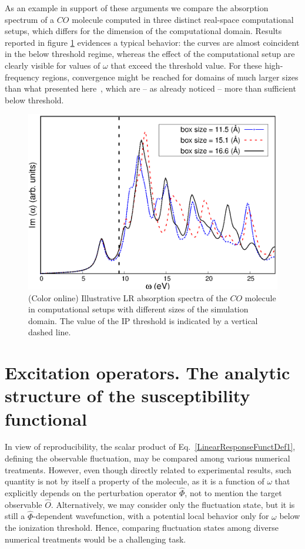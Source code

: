 \documentclass[reprint,aps,prb]{revtex4-1}
\newcommand{\op}[1]{\hat {#1}}
\begin{document}
As an example in support of these arguments we compare the absorption spectrum of a $CO$ molecule computed in 
three distinct real-space computational setups, which differs for the dimension of 
the computational domain. 
Results reported in figure \ref{co_spectrum} evidences a typical behavior: the curves are almost coincident in the below threshold regime,
whereas the effect of the computational setup are clearly visible for values of $\omega$ that exceed the threshold value.
For these high-frequency regions, convergence might be reached for domains of much larger sizes than what presented here~\cite{baroni2008},
which are -- as already noticed -- more than sufficient below threshold.

\begin{figure}
\includegraphics[scale=0.6]{Fig2_CO_spectrum.eps}
\caption{\label{co_spectrum}(Color online) Illustrative LR absorption spectra of the $CO$ molecule in computational setups with different sizes of the simulation domain. The value of the IP threshold is indicated by a vertical dashed line.}
\end{figure}


\section{Excitation operators. The analytic structure of the susceptibility functional}

In view of reproducibility, the scalar product of Eq.~\eqref{LinearResponseFunctDef1}, defining the observable fluctuation, may be compared among various numerical treatments.
However, even though directly related to experimental results, such quantity is not by itself a property of the molecule, as it is a function of $\omega$ that explicitly depends 
on the perturbation operator $\op \Phi$, not to mention the target observable $\op O$. Alternatively, we may consider only the fluctuation state, but it is still a $\op \Phi$-dependent wavefunction, 
with a potential local behavior only for $\omega$ below the ionization threshold. Hence, comparing fluctuation states among diverse numerical treatments would be a 
challenging task.
\end{document}
